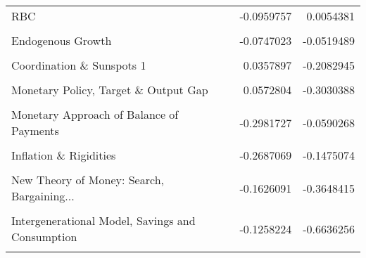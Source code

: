 \documentclass[
  12pt,
  onecolumn]{article}
\begin{document}
\begin{table}[!h]
\begin{tabular}[t]{lrr}
RBC & -0.0959757 & 0.0054381\\
\cellcolor{gray!6}{Exchange Rate Dynamics \& Expectations} & \cellcolor{gray!6}{-0.2967066} & \cellcolor{gray!6}{0.1774216}\\
Endogenous Growth & -0.0747023 & -0.0519489\\
\addlinespace
\cellcolor{gray!6}{REH, Monetary Policy \& Business Cycles} & \cellcolor{gray!6}{-0.1537143} & \cellcolor{gray!6}{-0.0007970}\\
Coordination \& Sunspots 1 & 0.0357897 & -0.2082945\\
\cellcolor{gray!6}{Inflation, Interest Rates \& Expectations} & \cellcolor{gray!6}{-0.0920877} & \cellcolor{gray!6}{-0.1176102}\\
Monetary Policy, Target \& Output Gap & 0.0572804 & -0.3030388\\
\cellcolor{gray!6}{Credit Rationing, Rational Expectations \& Imperfect Information} & \cellcolor{gray!6}{-0.0936330} & \cellcolor{gray!6}{-0.2050900}\\
\addlinespace
Monetary Approach of Balance of Payments & -0.2981727 & -0.0590268\\
\cellcolor{gray!6}{Demand for Money} & \cellcolor{gray!6}{-0.0293277} & \cellcolor{gray!6}{-0.3531459}\\
Inflation \& Rigidities & -0.2687069 & -0.1475074\\
\cellcolor{gray!6}{Permanent Income Hypothesis \& Life-Cycle} & \cellcolor{gray!6}{-0.2344867} & \cellcolor{gray!6}{-0.2867849}\\
New Theory of Money: Search, Bargaining... & -0.1626091 & -0.3648415\\
\addlinespace
\cellcolor{gray!6}{Monetary Economics \& Demand for Money} & \cellcolor{gray!6}{-0.2628286} & \cellcolor{gray!6}{-0.4754408}\\
Intergenerational Model, Savings and Consumption & -0.1258224 & -0.6636256\\
\cellcolor{gray!6}{Marginal Taxation} & \cellcolor{gray!6}{-0.3104399} & \cellcolor{gray!6}{-0.7927133}\\
\bottomrule
\end{tabular}
\end{table}

\begingroup\fontsize{8}{10}\selectfont
\end{document}
